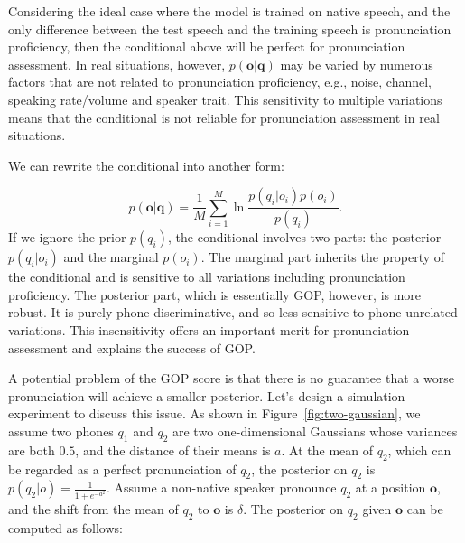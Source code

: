 \documentclass[a4paper]{article}
\begin{document}
\noindent Considering the ideal case where the model is trained on native speech, and the only difference between the test speech and
the training speech is pronunciation proficiency, then the conditional above will be perfect for pronunciation assessment.
In real situations, however, $p(\mathbf{o}|\mathbf{q})$ may be varied by numerous factors that are
not related to pronunciation proficiency, e.g., noise, channel, speaking rate/volume and speaker trait.
This sensitivity to multiple variations means that the conditional is not reliable for pronunciation assessment
in real situations.

We can rewrite the conditional into another form:

\[
p(\mathbf{o}|\mathbf{q}) = \frac{1}{M}  \sum_{i=1}^M \ln \frac{p(q_i|o_i)p(o_i)}{p(q_i)}.
\]
\noindent If we ignore the prior $p(q_i)$, the conditional involves two parts: the posterior $p(q_i|o_i)$ and the marginal $p(o_i)$.
The marginal part inherits the property of the conditional and is sensitive to all variations including pronunciation proficiency.
The posterior part, which is essentially GOP, however, is more robust. It is purely phone discriminative,
and so less sensitive to phone-unrelated variations. This insensitivity
offers an important merit for pronunciation assessment and explains the success of GOP.



A potential problem of the GOP score is that there is no guarantee that a worse pronunciation will achieve
a smaller posterior.
Let's design a simulation experiment to discuss this issue.
As shown in Figure~\ref{fig:two-gaussian}, we assume two phones $q_1$ and $q_2$ are two one-dimensional Gaussians whose variances are both $0.5$,
and the distance of their means is $a$. At the mean of $q_2$, which can be regarded as a perfect pronunciation of $q_2$,
the posterior on $q_2$ is $p(q_2|o)=\frac{1}{1+e^{-a^2}}$.
Assume a non-native speaker pronounce $q_2$ at a position $\mathbf{o}$, and the shift from the mean of $q_2$ to $\mathbf{o}$ is $\delta$.
The posterior on $q_2$ given $\mathbf{o}$ can be computed as follows:
\end{document}
